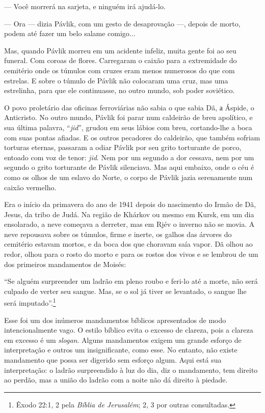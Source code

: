 --- Você morrerá na sarjeta, e ninguém irá ajudá-lo.

--- Ora --- dizia Pávlik, com um gesto de desaprovação ---, depois de
morto, podem até fazer um belo salame comigo...

Mas, quando Pávlik morreu em um acidente infeliz, muita gente foi ao seu
funeral. Com coroas de flores. Carregaram o caixão para a extremidade do
cemitério onde os túmulos com cruzes eram menos numerosos do que com
estrelas. E sobre o túmulo de Pávlik não colocaram uma cruz, mas uma
estrelinha, para que ele continuasse, no outro mundo, sob poder
soviético.

O povo proletário das oficinas ferroviárias não sabia o que sabia Dã, а
Áspide, o Anticristo. No outro mundo, Pávlik foi parar num caldeirão de
breu apolítico, e sua última palavra, ``\emph{jid}'', grudou em seus
lábios com breu, cortando-lhe a boca com suas pontas afiadas. E os
outros pecadores do caldeirão, que também sofriam torturas eternas,
passaram a odiar Pávlik por seu grito torturante de porco, entoado com
voz de tenor: \emph{jid}. Nem por um segundo a dor cessava, nem por um
segundo o grito torturante de Pávlik silenciava. Mas aqui embaixo, onde
o céu é como os olhos de um eslavo do Norte, o corpo de Pávlik jazia
serenamente num caixão vermelho.

Era o início da primavera do ano de 1941 depois do nascimento do Irmão
de Dã, Jesus, da tribo de Judá. Na região de Khárkov ou mesmo em Kursk,
em um dia ensolarado, a neve começava a derreter, mas em Rjév o inverno
não se movia. A neve repousava sobre os túmulos, firme e inerte, os
galhos das árvores do cemitério estavam mortos, e da boca dos que
choravam saía vapor. Dã olhou ao redor, olhou para o rosto do morto e
para os rostos dos vivos e se lembrou de um dos primeiros mandamentos de
Moisés:

``Se alguém surpreender um ladrão em pleno roubo e feri-lo até a morte,
não será culpado de verter seu sangue. Mas, se o sol já tiver se
levantado, o sangue lhe será imputado''.\footnote{Êxodo 22:1, 2 pela
  \emph{Bíblia de Jerusalém}; 2, 3 por outras consultadas.}

Esse foi um dos inúmeros mandamentos bíblicos apresentados de modo
intencionalmente vago. O estilo bíblico evita o excesso de clareza, pois
a clareza em excesso é um \emph{slogan}. Alguns mandamentos exigem um
grande esforço de interpretação e outros um insignificante, como esse.
No entanto, não existe mandamento que possa ser digerido sem esforço
algum. Aqui está sua interpretação: o ladrão surpreendido à luz do dia,
diz o mandamento, tem direito ao perdão, mas a união do ladrão com a
noite não dá direito à piedade.

